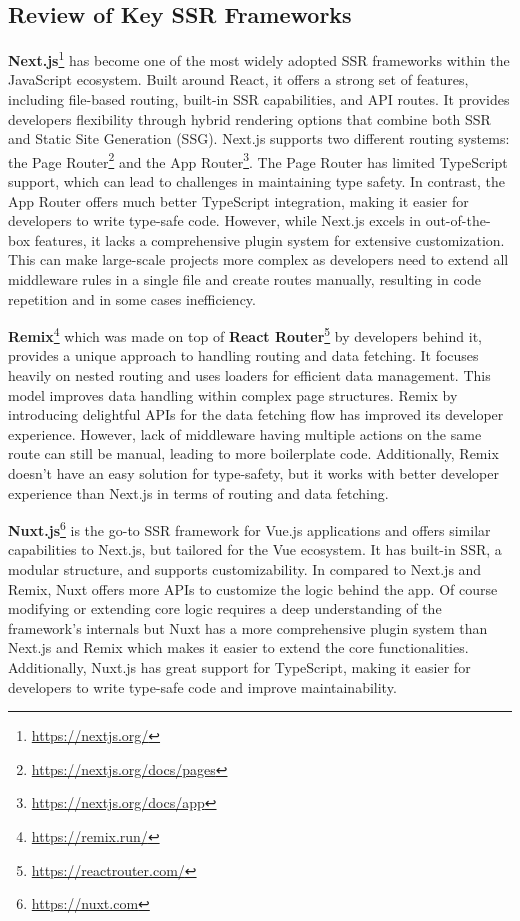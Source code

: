 \subsection{Review of Key SSR Frameworks}

\textbf{Next.js}\footnote{\url{https://nextjs.org/}} has become one of the most widely adopted SSR frameworks within the JavaScript ecosystem. Built around React, it offers a strong set of features, including file-based routing, built-in SSR capabilities, and API routes. It provides developers flexibility through hybrid rendering options that combine both SSR and Static Site Generation (SSG). Next.js supports two different routing systems: the Page Router\footnote{\url{https://nextjs.org/docs/pages}} and the App Router\footnote{\url{https://nextjs.org/docs/app}}. The Page Router has limited TypeScript support, which can lead to challenges in maintaining type safety. In contrast, the App Router offers much better TypeScript integration, making it easier for developers to write type-safe code. However, while Next.js excels in out-of-the-box features, it lacks a comprehensive plugin system for extensive customization. This can make large-scale projects more complex as developers need to extend all middleware rules in a single file and create routes manually, resulting in code repetition and in some cases inefficiency.

\textbf{Remix}\footnote{\url{https://remix.run/}} which was made on top of \textbf{React Router}\footnote{\url{https://reactrouter.com/}} by developers behind it, provides a unique approach to handling routing and data fetching. It focuses heavily on nested routing and uses loaders for efficient data management. This model improves data handling within complex page structures. Remix by introducing delightful APIs for the data fetching flow has improved its developer experience. However, lack of middleware having multiple actions on the same route can still be manual, leading to more boilerplate code. Additionally, Remix doesn't have an easy solution for type-safety, but it works with better developer experience than Next.js in terms of routing and data fetching.


\textbf{Nuxt.js}\footnote{\url{https://nuxt.com}} is the go-to SSR framework for Vue.js applications and offers similar capabilities to Next.js, but tailored for the Vue ecosystem. It has built-in SSR, a modular structure, and supports customizability. In compared to Next.js and Remix, Nuxt offers more APIs to customize the logic behind the app. Of course modifying or extending core logic requires a deep understanding of the framework’s internals but Nuxt has a more comprehensive plugin system than Next.js and Remix which makes it easier to extend the core functionalities. Additionally, Nuxt.js has great support for TypeScript, making it easier for developers to write type-safe code and improve maintainability.

